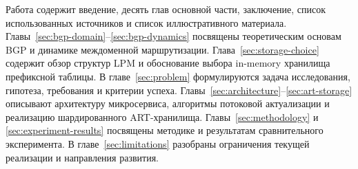 Работа содержит введение, десять глав основной части, заключение, список
использованных источников и список иллюстративного материала.
Главы~\ref{sec:bgp-domain}--\ref{sec:bgp-dynamics} посвящены
теоретическим основам BGP и динамике междоменной маршрутизации.
Глава~\ref{sec:storage-choice} содержит обзор структур LPM и обоснование
выбора in-memory хранилища префиксной таблицы. В
главе~\ref{sec:problem} формулируются задача исследования, гипотеза,
требования и критерии успеха. Главы~\ref{sec:architecture}--\ref{sec:art-storage}
описывают архитектуру микросервиса, алгоритмы потоковой актуализации и
реализацию шардированного ART-хранилища. Главы~\ref{sec:methodology} и
\ref{sec:experiment-results} посвящены методике и результатам
сравнительного эксперимента. В главе~\ref{sec:limitations} разобраны
ограничения текущей реализации и направления развития.

